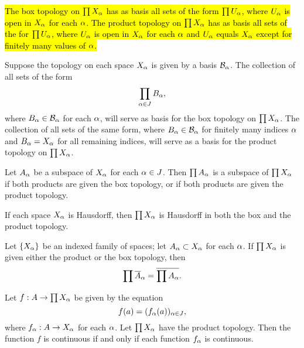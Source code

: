 \vs

\begin{thm}
\hl{The box topology on $\prod X_\alpha$ has as basis all sets of the form $\prod U_\alpha$, where $U_\alpha$ is open in $X_\alpha$ for each $\alpha$. The product topology on $\prod X_\alpha$ has as basis all sets of the for $\prod U_\alpha$, where $U_\alpha$ is open in $X_\alpha$ for each $\alpha$ and $U_\alpha$ equals $X_\alpha$ except for finitely many values of $\alpha$.}
\end{thm}

\vs

\begin{thm} Suppose the topology on each space $X_\alpha$ is given by a basis $\mathcal{B}_\alpha$. The collection of all sets of the form 
\[\prod_{\alpha\in J} B_\alpha,\]
where $B_\alpha\in \mathcal{B}_\alpha$ for each $\alpha$, will serve as basis for the box topology on $\prod X_\alpha$. The collection of all sets of the same form, where $B_\alpha\in \mathcal{B}_\alpha$ for finitely many indices $\alpha$ and $B_\alpha = X_\alpha$ for all remaining indices, will serve as a basis for the product topology on $\prod X_\alpha$.
\end{thm}

\vs

\begin{thm}
Let $A_\alpha$ be a subspace of $X_\alpha$ for each $\alpha \in J$. Then $\prod A_\alpha$ is a subspace of $\prod X_\alpha$ if both products are given the box topology, or if both products are given the product topology.
\end{thm}

\vs

\begin{thm}
If each space $X_\alpha$ is Hausdorff, then $\prod X_\alpha$ is Hausdorff in both the box and the product topology.
\end{thm}

\vs

\begin{thm}
Let $\{X_\alpha\}$ be an indexed family of spaces; let $A_\alpha\subset X_\alpha$ for each $\alpha$. If $\prod X_\alpha$ is given either the product or the box topology, then
\[\prod \overline A_\alpha = \overline{\prod A_\alpha}.\]
\end{thm}

\vs

\begin{thm}
Let $f:A\rightarrow \prod X_\alpha$ be given by the equation
\[f(a) = (f_\alpha(a))_{\alpha\in J},\]
where $f_\alpha: A\rightarrow X_\alpha$ for each $\alpha$. Let $\prod X_\alpha$ have the product topology. Then the function $f$ is continuous if and only if each function $f_\alpha$ is continuous.
\end{thm}


